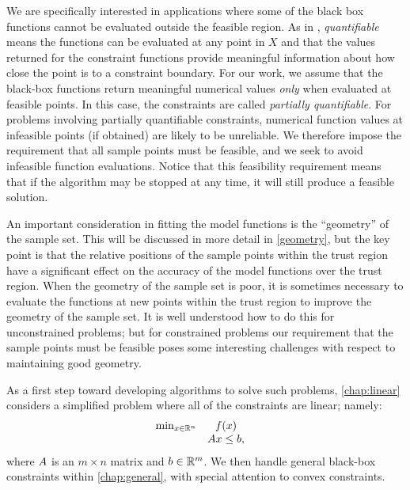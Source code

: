 We are specifically interested in applications where some of the black box functions cannot be evaluated outside the feasible region.
As in \cite{digabel2015taxonomy}, {\em quantifiable} means the functions can be evaluated at any point in $X$ and that the values returned for the constraint functions provide meaningful information about how close the point is to a constraint boundary.
For our work, we assume that the black-box functions return meaningful numerical values \emph{only} when evaluated at feasible points.
In this case,  the constraints are called {\em partially quantifiable}.    
For problems involving partially quantifiable constraints,  numerical function values at infeasible points (if obtained) are likely to be unreliable.   We therefore impose 
the requirement that all sample points must be feasible, and we seek to avoid infeasible function evaluations.
Notice that this feasibility requirement means that if the algorithm may be stopped at any time, it will still produce a feasible solution.


An important consideration in fitting the model functions is the ``geometry'' of the sample set.
This will be discussed in more detail in \cref{geometry}, but the key point is that the relative positions of the sample points within the trust region have a significant effect on the accuracy of the model functions over the trust region.
When the geometry of the sample set is poor, it is sometimes necessary to evaluate the functions at new points within the trust region to improve the geometry of the sample set.
It is well understood how to do this for unconstrained problems; but for constrained problems
our requirement that the sample points must be feasible  poses some interesting challenges with respect to maintaining good geometry.   

As a first step toward developing algorithms to solve such problems,  \cref{chap:linear}  considers a simplified problem where all of the constraints are linear; namely:
\begin{align*}
\begin{array}{ccl} \min_{x \in \mathbb R^n} & f(x) \\
& {A} x \le {b}, & 
\end{array}
\end{align*}
where ${A}$ is an $m \times n$ matrix and ${b} \in \mathbb R^m$.
We then handle general black-box constraints within \cref{chap:general}, with special attention to convex constraints.

